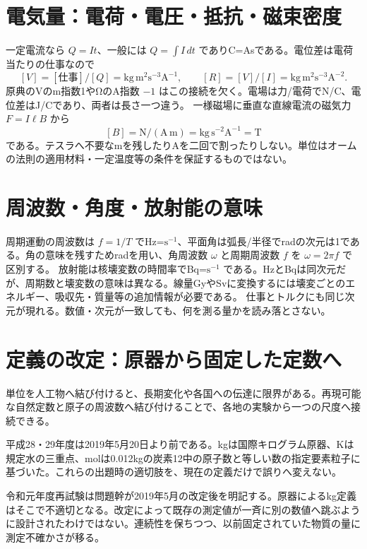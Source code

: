\section{電気量：電荷・電圧・抵抗・磁束密度}\label{theory:units:electrical}
一定電流なら \(Q=It\)、一般には \(Q=\int I\,dt\) でありC=Asである。電位差は電荷当たりの仕事なので
\[
 [V]=[\text{仕事}]/[Q]=\mathrm{kg\,m^2s^{-3}A^{-1}},\qquad
 [R]=[V]/[I]=\mathrm{kg\,m^2s^{-3}A^{-2}}.
\]
原典のVのm指数1やΩのA指数 \(-1\) はこの接続を欠く。電場は力/電荷でN/C、電位差はJ/Cであり、両者は長さ一つ違う。
一様磁場に垂直な直線電流の磁気力 \(F=I\ell B\) から
\[
 [B]=\mathrm{N/(A\,m)}=\mathrm{kg\,s^{-2}A^{-1}}=\mathrm T
\]
である。テスラへ不要なmを残したりAを二回で割ったりしない。単位はオームの法則の適用材料・一定温度等の条件を保証するものではない\cite{si_nist811}。

\section{周波数・角度・放射能の意味}\label{theory:units:angle}\label{theory:units:activity}
周期運動の周波数は \(f=1/T\) でHz=\(\mathrm{s^{-1}}\)、平面角は弧長/半径でradの次元は1である。角の意味を残すためradを用い、角周波数 \(\omega\) と周期周波数 \(f\) を \(\omega=2\pi f\) で区別する。
放射能は核壊変数の時間率でBq=\(\mathrm{s^{-1}}\) である。HzとBqは同次元だが、周期数と壊変数の意味は異なる。線量GyやSvに変換するには壊変ごとのエネルギー、吸収先・質量等の追加情報が必要である。
仕事とトルクにも同じ次元が現れる。数値・次元が一致しても、何を測る量かを読み落とさない\cite{si_brochure9}。

\section{定義の改定：原器から固定した定数へ}\label{theory:units:history}
単位を人工物へ結び付けると、長期変化や各国への伝達に限界がある。再現可能な自然定数と原子の周波数へ結び付けることで、各地の実験から一つの尺度へ接続できる。
\begin{tcolorbox}[title=出題時の定義を固定する]
平成28・29年度は2019年5月20日より前である。kgは国際キログラム原器、Kは規定水の三重点、molは0.012kgの炭素12中の原子数と等しい数の指定要素粒子に基づいた。これらの出題時の適切肢を、現在の定義だけで誤りへ変えない。
\end{tcolorbox}
令和元年度再試験は問題幹が2019年5月の改定後を明記する。原器によるkg定義はそこで不適切となる。改定によって既存の測定値が一斉に別の数値へ跳ぶように設計されたわけではない。連続性を保ちつつ、以前固定されていた物質の量に測定不確かさが移る\cite{si_cgpm2018,si_nist811}。

